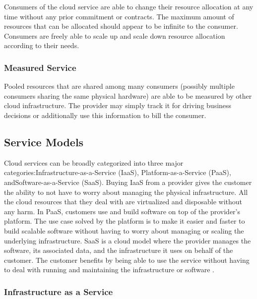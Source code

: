 \documentclass[12pt]{article}
\begin{document}
Consumers of the cloud service are able to change their resource allocation at any time without any prior commitment or contracts. The maximum amount of resources that can be allocated should appear to be infinite to the consumer. Consumers are freely able to scale up and scale down resource allocation according to their needs.


\subsubsection{Measured Service} \label{ssub:measured-service}

Pooled resources that are shared among many consumers (possibly multiple consumers sharing the same physical hardware) are able to be measured by other cloud infrastructure. The provider may simply track it for driving business decisions or additionally use this information to bill the consumer.



\subsection{Service Models} \label{sub:servicemodels}

Cloud services can be broadly categorized into three major categories:\linebreak Infrastructure-as-a-Service (IaaS), Platform-as-a-Service (PaaS), and\linebreak Software-as-a-Service (SaaS). Buying IaaS from a provider gives the customer the ability to not have to worry about managing the physical infrastructure. All the cloud resources that they deal with are virtualized and disposable without any harm. In PaaS, customers use and build software on top of the provider's platform. The use case solved by the platform is to make it easier and faster to build scalable software without having to worry about managing or scaling the underlying infrastructure. SaaS is a cloud model where the provider manages the software, its associated data, and the infrastructure it uses on behalf of the customer. The customer benefits by being able to use the service without having to deal with running and maintaining the infrastructure or software \cite{Manvi2014}.

\subsubsection{Infrastructure as a Service} \label{ssub:iaas}
\end{document}
